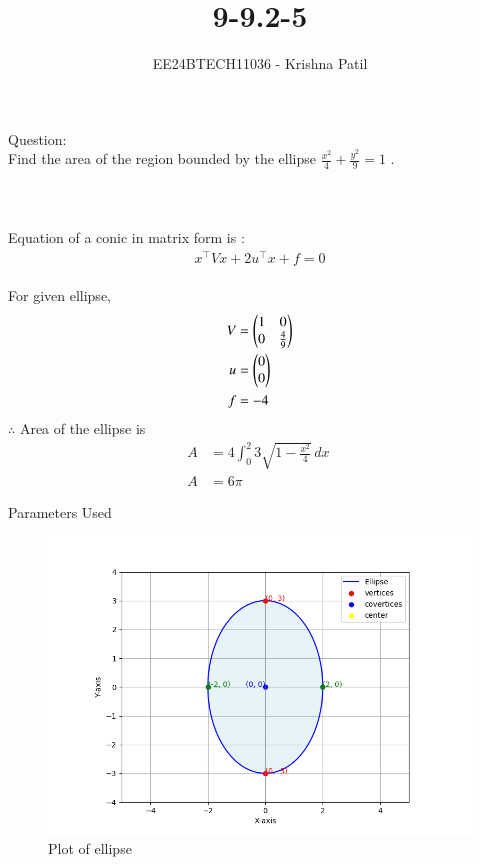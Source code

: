\documentclass[journal]{IEEEtran}
\begin{document}

\vspace{3cm}

\title{9-9.2-5}
\author{EE24BTECH11036 - Krishna Patil}
{\let\newpage\relax\maketitle}
Question: \\
 Find the area of the region bounded by the ellipse $ \frac{x^2}{4} + \frac{y^2}{9} = 1 $ . 
 \\ \\
\solution \\ \\
Equation of a conic in matrix form is : \\
\begin{align}
    x^\top V x + 2u^\top {x} + f = 0
\end{align} \\ 
For given ellipse, \\
\begin{align}
    V&= \begin{pmatrix}1 & 0 \\ 0 & \frac{4}{9}\end{pmatrix} \\
    u&= \begin{pmatrix}0 \\ 0\end{pmatrix} \\
    f&=-4 
\end{align}
$ \therefore $ Area of the ellipse is  
\begin{align}
    A &= 4 \int_{0}^{2} 3 \sqrt{1 - \frac{x^2}{4}} \, dx\ \\
    A &= 6\pi
\end{align}
\begin{table}[h!]    	
    \centering
     
    \caption{Parameters Used}
    \label{tab:1-1.9-6}
\end{table}
\begin{figure}[ht]
    \centering
    \includegraphics[width = 1\linewidth]{figs/Figure_1.png}
    \caption{Plot of ellipse}
    \label{fig:stemplot}
\end{figure}
\end{document}

